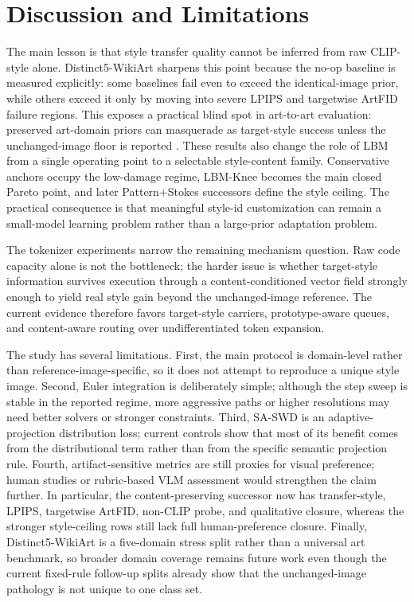 \documentclass[letterpaper]{article}
\begin{document}
\section{Discussion and Limitations}
The main lesson is that style transfer quality cannot be inferred from raw CLIP-style alone. Distinct5-WikiArt sharpens this point because the no-op baseline is measured explicitly: some baselines fail even to exceed the identical-image prior, while others exceed it only by moving into severe LPIPS and targetwise ArtFID failure regions. This exposes a practical blind spot in art-to-art evaluation: preserved art-domain priors can masquerade as target-style success unless the unchanged-image floor is reported \cite{zhou2024comprehensiveeval,yeh2020calibrated,wright2022artfid}. These results also change the role of LBM from a single operating point to a selectable style-content family. Conservative anchors occupy the low-damage regime, LBM-Knee becomes the main closed Pareto point, and later Pattern+Stokes successors define the style ceiling. The practical consequence is that meaningful style-id customization can remain a small-model learning problem rather than a large-prior adaptation problem.

The tokenizer experiments narrow the remaining mechanism question. Raw code capacity alone is not the bottleneck; the harder issue is whether target-style information survives execution through a content-conditioned vector field strongly enough to yield real style gain beyond the unchanged-image reference. The current evidence therefore favors target-style carriers, prototype-aware queues, and content-aware routing over undifferentiated token expansion.

The study has several limitations. First, the main protocol is domain-level rather than reference-image-specific, so it does not attempt to reproduce a unique style image. Second, Euler integration is deliberately simple; although the step sweep is stable in the reported regime, more aggressive paths or higher resolutions may need better solvers or stronger constraints. Third, SA-SWD is an adaptive-projection distribution loss; current controls show that most of its benefit comes from the distributional term rather than from the specific semantic projection rule. Fourth, artifact-sensitive metrics are still proxies for visual preference; human studies or rubric-based VLM assessment would strengthen the claim further. In particular, the content-preserving successor now has transfer-style, LPIPS, targetwise ArtFID, non-CLIP probe, and qualitative closure, whereas the stronger style-ceiling rows still lack full human-preference closure. Finally, Distinct5-WikiArt is a five-domain stress split rather than a universal art benchmark, so broader domain coverage remains future work even though the current fixed-rule follow-up splits already show that the unchanged-image pathology is not unique to one class set.
\end{document}
